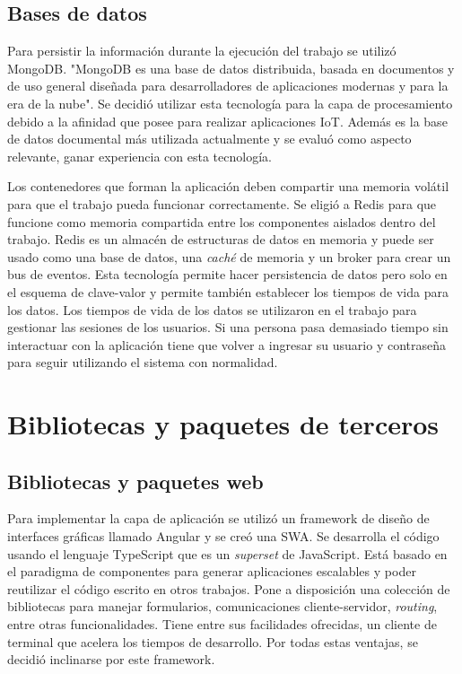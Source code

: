 \subsection{Bases de datos}
Para persistir la información durante la ejecución del trabajo se utilizó MongoDB.
"MongoDB es una base de datos distribuida, basada en documentos y de uso general diseñada para desarrolladores de aplicaciones modernas y para la era de la nube". \citep{WEBSITE:MongoHome}
Se decidió utilizar esta tecnología para la capa de procesamiento debido a la afinidad que posee para realizar aplicaciones IoT.
Además es la base de datos documental más utilizada actualmente \citep{WEBSITE:DBRanking} y se evaluó como aspecto relevante, ganar experiencia con esta tecnología.

Los contenedores que forman la aplicación deben compartir una memoria volátil para que el trabajo pueda funcionar correctamente.
Se eligió a Redis para que funcione como memoria compartida entre los componentes aislados dentro del trabajo.
Redis es un almacén de estructuras de datos en memoria y puede ser usado como una base de datos, una \emph{caché} de memoria y un broker para crear un bus de eventos.
Esta tecnología permite hacer persistencia de datos pero solo en el esquema de clave-valor y permite también establecer los tiempos de vida para los datos.
Los tiempos de vida de los datos se utilizaron en el trabajo para gestionar las sesiones de los usuarios.
Si una persona pasa demasiado tiempo sin interactuar con la aplicación tiene que volver a ingresar su usuario y contraseña para seguir utilizando el sistema con normalidad.	
	
\section{Bibliotecas y paquetes de terceros}

\subsection{Bibliotecas y paquetes web}
Para implementar la capa de aplicación se utilizó un framework de diseño de interfaces gráficas llamado Angular y se creó una SWA.
Se desarrolla el código usando el lenguaje TypeScript que es un \emph{superset} de JavaScript.
Está basado en el paradigma de componentes para generar aplicaciones escalables y poder reutilizar el código escrito en otros trabajos.
Pone a disposición una colección de bibliotecas para manejar formularios, comunicaciones cliente-servidor, \emph{routing}, entre otras funcionalidades.
Tiene entre sus facilidades ofrecidas, un cliente de terminal que acelera los tiempos de desarrollo.
Por todas estas ventajas, se decidió inclinarse por este framework.

